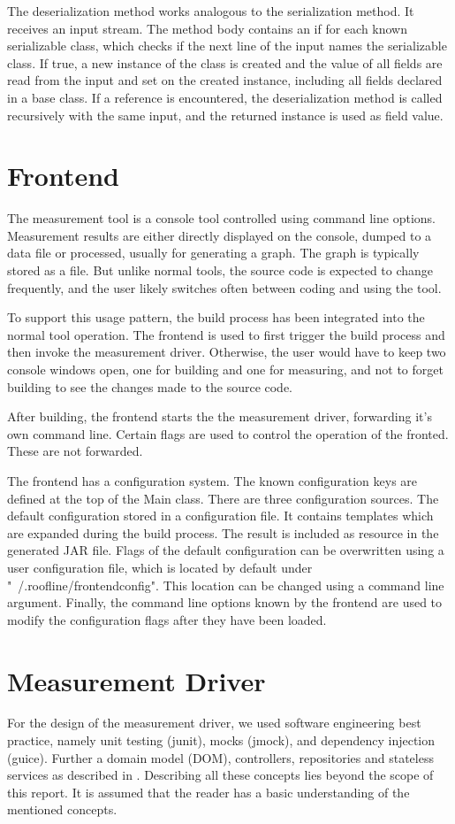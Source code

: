 \documentclass[a4paper,12pt]{report}
\begin{document}
The deserialization method works analogous to the serialization method. It
receives an input stream. The method body contains an if for each known
serializable class, which checks if the next line of the input names  the
serializable class. If true, a new instance of the class is created and the
value of all fields are read from the input and set on the created instance,
including all fields declared in a base class. If a reference is encountered,
the deserialization method is called recursively with the same input, and the
returned instance is used as field value.

\section{Frontend}
The measurement tool is a console tool controlled using command line options.
Measurement results are either directly displayed on the console, dumped to a
data file or processed, usually for generating a graph. The graph is typically
stored as a file. But unlike normal tools, the source code is expected to change
frequently, and the user likely switches often between coding and using the
tool.

To support this usage pattern, the build process has been integrated into the
normal tool operation. The frontend is used to first trigger the build process
and then invoke the measurement driver. Otherwise, the user would have to keep
two console windows open, one for building and one for measuring, and not to
forget building to see the changes made to the source code.

After building, the frontend starts the the measurement driver, forwarding it's
own command line. Certain flags are used to control the operation of the
fronted. These are not forwarded.

The frontend has a configuration system. The known configuration keys are
defined at the top of the Main class. There are three configuration sources. The
default configuration stored in a configuration file. It contains templates
which are expanded during the build process. The result is included as resource
in the generated JAR file. Flags of the default configuration can be overwritten
using a user configuration file, which is located by default under
"~/.roofline/frontendconfig". This location can be changed using a command line
argument. Finally, the command line options known by the frontend are used to
modify the configuration flags after they have been loaded. 

\section{Measurement Driver}
For the design of the measurement driver, we used software engineering best
practice, namely unit testing (junit), mocks (jmock), and dependency
injection (guice). Further a domain model (DOM), controllers, repositories and
stateless services as described in \cite{evans2004domain}.
Describing all these concepts lies beyond the scope of this report. It is
assumed that the reader has a basic understanding of the mentioned concepts.
\end{document}
